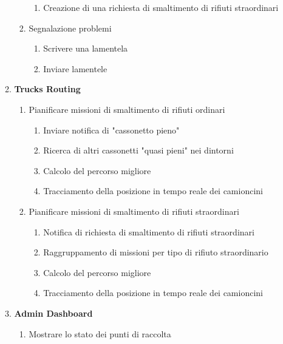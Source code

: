 \begin{itemize}
\begin{enumerate}[label*=\arabic*.]
\begin{enumerate}[label*=\arabic*.]
            \begin{enumerate}[label*=\arabic*.]
                \item Creazione di una richiesta di smaltimento di rifiuti straordinari
            \end{enumerate}
            \item Segnalazione problemi
            \begin{enumerate}[label*=\arabic*.]
                \item Scrivere una lamentela
                \item Inviare lamentele
            \end{enumerate}
        \end{enumerate}
        \item \textbf{Trucks Routing}
        \begin{enumerate}[label*=\arabic*.]
            \item Pianificare missioni di smaltimento di rifiuti ordinari
            \begin{enumerate}[label*=\arabic*.]
                \item Inviare notifica di "cassonetto pieno"
                \item Ricerca di altri cassonetti "quasi pieni" nei dintorni
                \item Calcolo del percorso migliore
                \item Tracciamento della posizione in tempo reale dei camioncini
            \end{enumerate}
            \item Pianificare missioni di smaltimento di rifiuti straordinari
            \begin{enumerate}[label*=\arabic*.]
                \item Notifica di richiesta di smaltimento di rifiuti straordinari
                \item Raggruppamento di missioni per tipo di rifiuto straordinario
                \item Calcolo del percorso migliore
                \item Tracciamento della posizione in tempo reale dei camioncini
            \end{enumerate}
        \end{enumerate}
        \item \textbf{Admin Dashboard}
        \begin{enumerate}[label*=\arabic*.]
            \item Mostrare lo stato dei punti di raccolta

\end{enumerate}
\end{enumerate}
\end{itemize}
